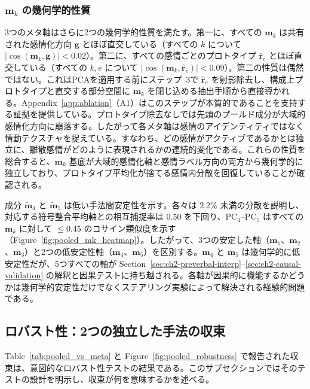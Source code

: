 \subsubsection*{$\mathbf{m}_k$ の幾何学的性質}
3つのメタ軸はさらに2つの幾何学的性質を満たす。第一に、すべての $\mathbf{m}_k$ は共有された感情化方向 $\mathbf{g}$ とほぼ直交している（すべての $k$ について $|\cos(\mathbf{m}_k,\mathbf{g})| < 0.02$）。第二に、すべての感情ごとのプロトタイプ $\hat{\mathbf{r}}_e$ とほぼ直交している（すべての $k,e$ について $|\cos(\mathbf{m}_k,\hat{\mathbf{r}}_e)| < 0.09$）。第二の性質は偶然ではない。これはPCAを適用する前にステップ~3で $\hat{\mathbf{r}}_e$ を射影除去し、構成上プロトタイプと直交する部分空間に $\mathbf{m}_k$ を閉じ込める抽出手順から直接導かれる。Appendix~\ref{app:ablation}（A1）はこのステップが本質的であることを支持する証拠を提供している。プロトタイプ除去なしでは先頭のプールド成分が大域的感情化方向に崩落する。したがって各メタ軸は感情のアイデンティティではなく情動テクスチャを捉えている。すなわち、どの感情がアクティブであるかとは独立に、離散感情がどのように表現されるかの連続的変化である。これらの性質を総合すると、$\mathbf{m}_k$ 基底が大域的感情化軸と感情ラベル方向の両方から幾何学的に独立しており、プロトタイプ平均化が捨てる感情内分散を回復していることが確認される。\par

成分 $\tilde{\mathbf{m}}_4$ と $\tilde{\mathbf{m}}_5$ は低い手法間安定性を示す。各々は $2.2\%$ 未満の分散を説明し、対応する符号整合平均軸との相互捕捉率は $0.50$ を下回り、PC$_4$--PC$_5$ はすべての $\mathbf{m}_k$ に対して $\leq 0.45$ のコサイン類似度を示す（Figure~\ref{fig:pooled_mk_heatmap}）。したがって、3つの安定した軸（$\mathbf{m}_1$、$\mathbf{m}_2$、$\mathbf{m}_3$）と2つの低安定性軸（$\mathbf{m}_4$、$\mathbf{m}_5$）を区別する。$\mathbf{m}_4$ と $\mathbf{m}_5$ は幾何学的に低安定性だが、5つすべての軸が Section~\ref{sec:ch2-preverbal-interp}--\ref{sec:ch2-causal-validation} の解釈と因果テストに持ち越される。各軸が因果的に機能するかどうかは幾何学的安定性だけでなくステアリング実験によって解決される経験的問題である。\par

\subsection{ロバスト性：2つの独立した手法の収束}
\label{sec:ch2-pooled-robustness}

Table~\ref{tab:pooled_vs_meta} と Figure~\ref{fig:pooled_robustness} で報告された収束は、意図的なロバスト性テストの結果である。このサブセクションではそのテストの設計を明示し、収束が何を意味するかを述べる。\par

